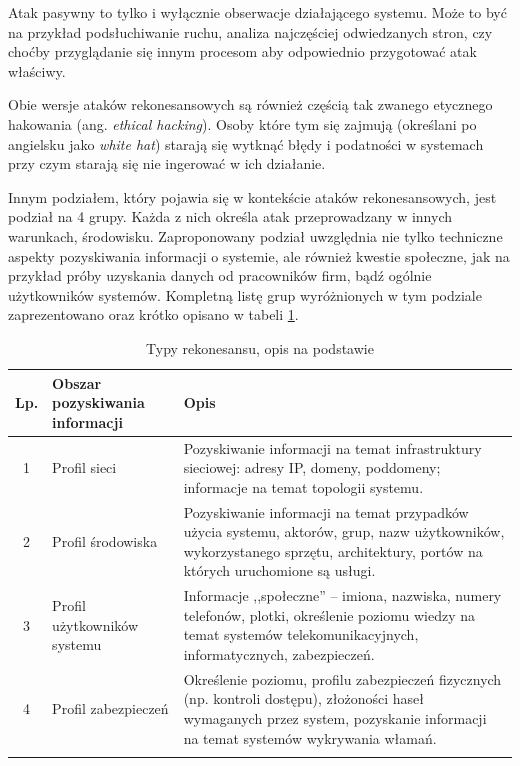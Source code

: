 Atak pasywny to tylko i wyłącznie obserwacje działającego systemu. Może to być na przykład podsłuchiwanie ruchu, analiza najczęściej
odwiedzanych stron, czy choćby przyglądanie się innym procesom aby odpowiednio przygotować atak właściwy.

Obie wersje ataków rekonesansowych są również częścią tak zwanego etycznego hakowania (ang. \textit{ethical hacking}). Osoby które
tym się zajmują (określani po angielsku jako \textit{white hat}) starają się wytknąć błędy i podatności w systemach przy czym starają
się nie ingerować w ich działanie.

Innym podziałem, który pojawia się w kontekście ataków rekonesansowych, jest podział na 4 grupy. Każda z nich określa atak
przeprowadzany w innych warunkach, środowisku. Zaproponowany podział uwzględnia nie tylko techniczne aspekty pozyskiwania informacji
o systemie, ale również kwestie społeczne, jak na przykład próby uzyskania danych od pracowników firm, bądź ogólnie użytkowników
systemów. Kompletną listę grup wyróżnionych w tym podziale zaprezentowano oraz krótko opisano w tabeli \ref{tab:rekonesans}.

\begin{longtable}{|c|p{4cm}|p{8cm}|}
	\hline
	\textbf{Lp.} &
	\textbf{Obszar pozyskiwania informacji} &
	\textbf{Opis} \\ \hline\hline
	1 & Profil sieci &
	Pozyskiwanie informacji na temat infrastruktury sieciowej: adresy IP, domeny, poddomeny; informacje na temat topologii
	systemu.\\
	\hline
  	2 & Profil środowiska &
	Pozyskiwanie informacji na temat przypadków użycia systemu, aktorów, grup, nazw użytkowników, wykorzystanego sprzętu, architektury,
	portów na których uruchomione są usługi.
  	\\
	\hline
	3 & Profil użytkowników systemu &
	Informacje ,,społeczne'' -- imiona, nazwiska, numery telefonów, plotki, określenie poziomu wiedzy na temat systemów
	telekomunikacyjnych, informatycznych, zabezpieczeń.
	\\
	\hline
	4 & Profil zabezpieczeń &
	Określenie poziomu, profilu zabezpieczeń fizycznych (np. kontroli dostępu), złożoności haseł wymaganych przez system, pozyskanie
	informacji na temat systemów wykrywania włamań.\\
	\hline
	\caption{Typy rekonesansu, opis na podstawie \cite{rekonesans}}
	\label{tab:rekonesans}
\end{longtable}

